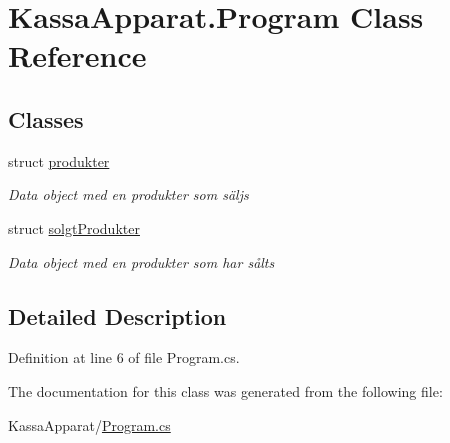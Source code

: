 \hypertarget{class_kassa_apparat_1_1_program}{}\section{Kassa\+Apparat.\+Program Class Reference}
\label{class_kassa_apparat_1_1_program}
\subsection*{Classes}
\begin{DoxyCompactItemize}
\item 
struct \mbox{\hyperlink{struct_kassa_apparat_1_1_program_1_1produkter}{produkter}}
\begin{DoxyCompactList}\small\item\em Data object med en produkter som säljs \end{DoxyCompactList}\item 
struct \mbox{\hyperlink{struct_kassa_apparat_1_1_program_1_1solgt_produkter}{solgt\+Produkter}}
\begin{DoxyCompactList}\small\item\em Data object med en produkter som har sålts \end{DoxyCompactList}\end{DoxyCompactItemize}


\subsection{Detailed Description}


Definition at line 6 of file Program.\+cs.



The documentation for this class was generated from the following file\+:\begin{DoxyCompactItemize}
\item 
Kassa\+Apparat/\mbox{\hyperlink{_program_8cs}{Program.\+cs}}\end{DoxyCompactItemize}
